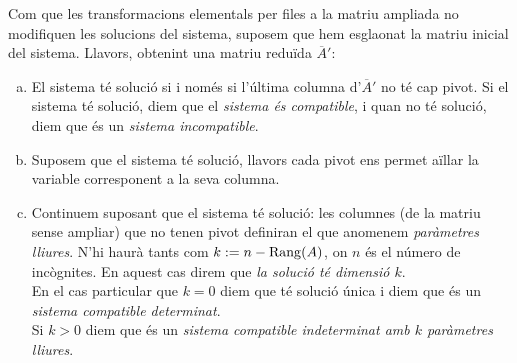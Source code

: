Com que les transformacions elementals per files a la matriu ampliada no modifiquen les solucions del sistema, suposem que hem esglaonat la matriu inicial del sistema. Llavors, obtenint una matriu reduïda $\overline{A}'$:
\begin{enumerate}[(a)]
	\item El sistema té solució si i només si l'última columna d'$\overline{A}'$ no té cap pivot. Si el sistema té solució, diem que el \emph{sistema és compatible}, i quan no té solució, diem que és un \emph{sistema incompatible}.
	\item Suposem que el sistema té solució, llavors cada pivot ens permet aïllar la variable corresponent a la seva columna.
	\item Continuem suposant que el sistema té solució: les columnes (de la matriu sense ampliar) que no tenen pivot definiran el que anomenem \emph{paràmetres lliures}. N'hi haurà tants com $k:=n-\operatorname{Rang}(A)$, on $n$ és el número de incògnites. En aquest cas direm que \emph{la solució té dimensió $k$}.\\
	En el cas particular que $k=0$ diem que té solució única i diem que és un \emph{sistema compatible determinat}.\\
	Si $k>0$ diem que és un \emph{sistema compatible indeterminat amb $k$ paràmetres lliures}.
\end{enumerate}
